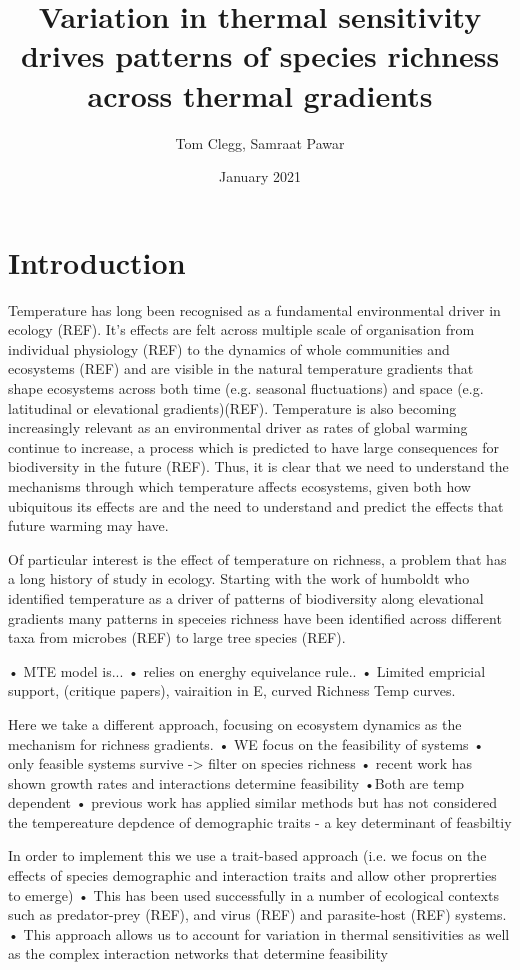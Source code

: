 \documentclass{article}
\title{Variation in thermal sensitivity drives patterns of species richness across thermal gradients}
\author{Tom Clegg, Samraat Pawar}
\date{January 2021}
\begin{document}
\maketitle

\section{Introduction}

Temperature has long been recognised as a fundamental environmental driver in ecology (REF). It's effects are felt across multiple scale of organisation from individual physiology (REF) to the dynamics of whole communities and ecosystems (REF) and are visible in the natural temperature gradients that shape ecosystems across both time (e.g. seasonal fluctuations) and space (e.g. latitudinal or elevational gradients)(REF). Temperature is also becoming increasingly relevant as an environmental driver as rates of global warming continue to increase, a process which is predicted to have large consequences for biodiversity in the future (REF). Thus, it is clear that we need to understand the mechanisms through which temperature affects ecosystems, given both how ubiquitous its effects are and the need to understand and predict the effects that future warming may have. 

Of particular interest is the effect of temperature on richness, a problem that has a long history of study in ecology. Starting with the work of humboldt who identified temperature as a driver of patterns of biodiversity along elevational gradients many patterns in speceies richness have been identified across different taxa from microbes (REF) to large tree species (REF). 

• MTE model is...
• relies on energhy equivelance rule..
• Limited empricial support, (critique papers), vairaition in E, curved Richness Temp curves. 

Here we take a different approach, focusing on ecosystem dynamics as the mechanism for richness gradients. 
• WE focus on the feasibility of systems
    • only feasible systems survive -> filter on species richness
• recent work has shown growth rates and interactions determine feasibility
    •Both are temp dependent
• previous work has applied similar methods but has not considered the tempereature depdence of demographic traits - a key determinant of feasbiltiy

In order to implement this we use a trait-based approach (i.e. we focus on the effects of species demographic and interaction traits and allow other proprerties to emerge) 
 • This has been used successfully in a number of ecological contexts such as predator-prey (REF), and virus (REF) and parasite-host (REF)  systems.  
 • This approach allows us to account for variation in thermal sensitivities as well as the complex interaction networks that determine feasibility
 
\end{document}
